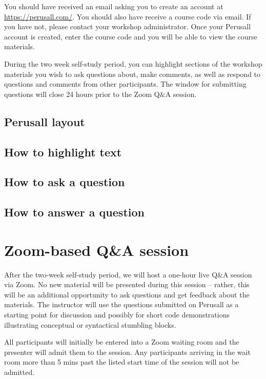 \documentclass[]{book}
\begin{document}
You should have received an email asking you to create an account at \url{https://perusall.com/}. You should also have receive a course code via email. If you have not, please contact your workshop administrator. Once your Perusall account is created, enter the course code and you will be able to view the course materials.

During the two week self-study period, you can highlight sections of the workshop materials you wish to ask questions about, make comments, as well as respond to questions and comments from other participants. The window for submitting questions will close 24 hours prior to the Zoom Q\&A session.

\hypertarget{perusall-layout}{%
\section{Perusall layout}\label{perusall-layout}}

\hypertarget{how-to-highlight-text}{%
\section{How to highlight text}\label{how-to-highlight-text}}

\hypertarget{how-to-ask-a-question}{%
\section{How to ask a question}\label{how-to-ask-a-question}}

\hypertarget{how-to-answer-a-question}{%
\section{How to answer a question}\label{how-to-answer-a-question}}

\hypertarget{zoom-based-qa-session}{%
\chapter*{Zoom-based Q\&A session}\label{zoom-based-qa-session}}

After the two-week self-study period, we will host a one-hour live Q\&A session via Zoom. No new material will be presented during this session -- rather, this will be an additional opportunity to ask questions and get feedback about the materials. The instructor will use the questions submitted on Perusall as a starting point for discussion and possibly for short code demonstrations illustrating conceptual or syntactical stumbling blocks.

All participants will initially be entered into a Zoom waiting room and the presenter will admit them to the session. Any participants arriving in the wait room more than 5 mins past the listed start time of the session will not be admitted.
\end{document}
